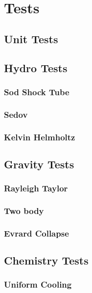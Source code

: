 \section{Tests}

\subsection{Unit Tests}

\subsection{Hydro Tests}
\subsubsection{Sod Shock Tube}
\subsubsection{Sedov}
\subsubsection{Kelvin Helmholtz}

\subsection{Gravity Tests}
\subsubsection{Rayleigh Taylor}
\subsubsection{Two body}
\subsubsection{Evrard Collapse}

\subsection{Chemistry Tests}
\subsubsection{Uniform Cooling}
